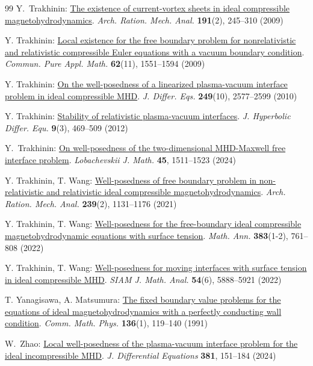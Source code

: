 \documentclass[twoside,11pt]{article}
\numberwithin{equation}{section}
\begin{document}
{\begin{thebibliography}{99}
 Y.~Trakhinin: \href{https://doi.org/10.1007/s00205-008-0124-6}{The existence of current-vortex sheets in ideal compressible magnetohydrodynamics}. {\it Arch. Ration. Mech. Anal.} {\bf 191}(2), 245--310 (2009)			
			
			 Y. Trakhinin: \href{https://doi.org/10.1002/cpa.20282}{Local existence for the free boundary problem for nonrelativistic and relativistic compressible Euler equations with a vacuum boundary condition}. {\it Commun. Pure Appl. Math.} {\bf 62}(11), 1551--1594 (2009)
			
			 Y. Trakhinin: \href{https://doi.org/10.1016/j.jde.2010.06.007}{On the well-posedness of a linearized plasma-vacuum interface problem in ideal compressible MHD}. {\it J. Differ. Eqs.} {\bf 249}(10), 2577--2599 (2010)
			
			 Y. Trakhinin: \href{https://doi.org/10.1142/S0219891612500154}{Stability of relativistic plasma-vacuum interfaces}. {\it J. Hyperbolic Differ. Equ.} {\bf 9}(3), 469--509 (2012)


		 Y.~Trakhinin: \href{https://doi.org/10.1134/S1995080224601267}{On well-posedness of the two-dimensional MHD-Maxwell free interface problem}. {\it Lobachevskii J. Math.} {\bf 45}, 1511--1523  (2024)			
			
			 Y. Trakhinin, T. Wang: \href{https://doi.org/10.1007/s00205-020-01592-6}{Well-posedness of free boundary problem in non-relativistic and relativistic ideal compressible magnetohydrodynamics}. {\it Arch. Ration. Mech. Anal.} {\bf 239}(2), 1131--1176 (2021)
			
 Y. Trakhinin, T. Wang: \href{https://doi.org/10.1007/s00208-021-02180-z}{Well-posedness for the free-boundary ideal compressible magnetohydrodynamic equations with surface tension}. {\it Math. Ann.} {\bf 383}(1-2), 761--808 (2022)


 Y. Trakhinin, T. Wang: \href{https://doi.org/10.1137/22M1488429}{Well-posedness for moving interfaces with surface tension in ideal compressible MHD}. {\it SIAM J. Math. Anal.} {\bf 54}(6), 5888--5921 (2022)			
			
			 T. Yanagisawa, A. Matsumura: \href{https://doi.org/10.1007/BF02096793}{The fixed boundary value problems for the equations of ideal magnetohydrodynamics with a perfectly conducting wall condition}. {\it Comm. Math. Phys.} {\bf 136}(1), 119--140 (1991)

 W.~Zhao: \href{https://doi.org/10.1016/j.jde.2023.11.004}{Local well-posedness of the plasma-vacuum interface problem for the ideal incompressible MHD}. {\it J. Differential Equations} {\bf 381}, 151--184 (2024)


			
	\end{thebibliography}  }
	
	
 
	
\end{document}
